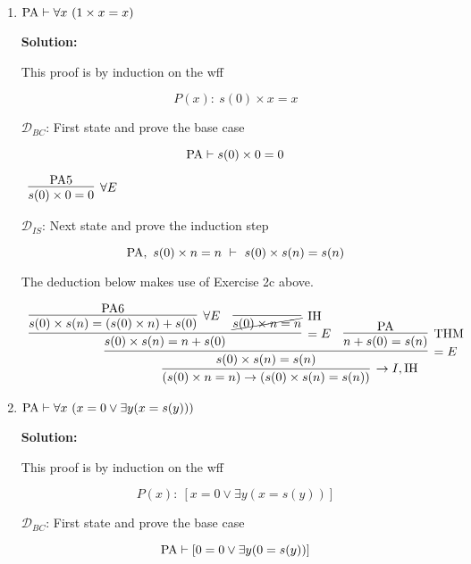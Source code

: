 \documentclass[11pt]{report}
\begin{document}
\begin{enumerate}
\begin{enumerate}
		\newpage
		\item $\text{PA} \vdash \forall x \ (1 \times x = x)$

		{\bf Solution:} 

		This proof is by induction on the wff 

		$$ P(x) : \ s(0) \times x = x$$

		$\mathcal{D}_{BC}$: First state and prove the base case 

		$$ \text{PA} \vdash s(0) \times 0 = 0$$

		\begin{mdframed}
			\begin{center}
				$\begin{array}{c}
					\infer[\forall E]{s(0)\times 0 = 0}
						{\PA 5}
				\end{array}$
			\end{center}
		\end{mdframed}

		$\mathcal{D}_{IS}$: Next state and prove the induction step

		$$ \PA, \ s(0)\times n = n \ \vdash \ s(0)\times s(n) = s(n)$$

		The deduction below makes use of Exercise 2c above. 

		\begin{mdframed}
			\begin{center}
				\footnotesize{$\begin{array}{c}
					\infer[\to I, \IH]{(s(0)\times n = n) \to (s(0)\times s(n) = s(n))}
						{\infer[=E]{s(0)\times s(n) = s(n)}
							{\infer[=E]{s(0)\times s(n) = n + s(0)}
								{\infer[\forall E]{s(0)\times s(n)= (s(0)\times n) + s(0)}{\PA 6}
								&
								\infer[\IH]{\cancel{s(0)\times n = n}}{}}
							&
							\infer[\THM]{n + s(0) = s(n)}{\PA}}}
				\end{array}$}
			\end{center}
		\end{mdframed}

		
		\newpage
		\item 
		
		\newpage
		$\text{PA} \vdash \forall x \ (x = 0 \lor \exists y (x = s(y)))$

		{\bf Solution:} 

		This proof is by induction on the wff 

		$$ P(x) : \ [x = 0 \lor \exists y (x = s(y))]$$

		$\mathcal{D}_{BC}$: First state and prove the base case 

		$$ \text{PA} \vdash [0 = 0 \lor \exists y (0 = s(y))]$$


\end{enumerate}
\end{enumerate}
\end{document}
